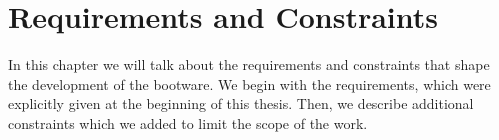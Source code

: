 \chapter{Requirements and Constraints}
\label{requirements}

In this chapter we will talk about the requirements and constraints that shape the development of the bootware.
We begin with the requirements, which were explicitly given at the beginning of this thesis.
Then, we describe additional constraints which we added to limit the scope of the work.



